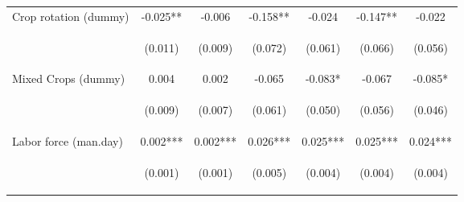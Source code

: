 \begin{center}
\begin{tabular}{lcccccc}
Crop rotation (dummy) & -0.025** & -0.006 & -0.158** & -0.024 & -0.147** & -0.022 \\
\vspace{4pt} & \begin{footnotesize}(0.011)\end{footnotesize} & \begin{footnotesize}(0.009)\end{footnotesize} & \begin{footnotesize}(0.072)\end{footnotesize} & \begin{footnotesize}(0.061)\end{footnotesize} & \begin{footnotesize}(0.066)\end{footnotesize} & \begin{footnotesize}(0.056)\end{footnotesize} \\
Mixed Crops (dummy) & 0.004 & 0.002 & -0.065 & -0.083* & -0.067 & -0.085* \\
\vspace{4pt} & \begin{footnotesize}(0.009)\end{footnotesize} & \begin{footnotesize}(0.007)\end{footnotesize} & \begin{footnotesize}(0.061)\end{footnotesize} & \begin{footnotesize}(0.050)\end{footnotesize} & \begin{footnotesize}(0.056)\end{footnotesize} & \begin{footnotesize}(0.046)\end{footnotesize} \\
Labor force (man.day) & 0.002*** & 0.002*** & 0.026*** & 0.025*** & 0.025*** & 0.024*** \\
\vspace{4pt} & \begin{footnotesize}(0.001)\end{footnotesize} & \begin{footnotesize}(0.001)\end{footnotesize} & \begin{footnotesize}(0.005)\end{footnotesize} & \begin{footnotesize}(0.004)\end{footnotesize} & \begin{footnotesize}(0.004)\end{footnotesize} & \begin{footnotesize}(0.004)\end{footnotesize} \\

\end{tabular}
\end{center}
